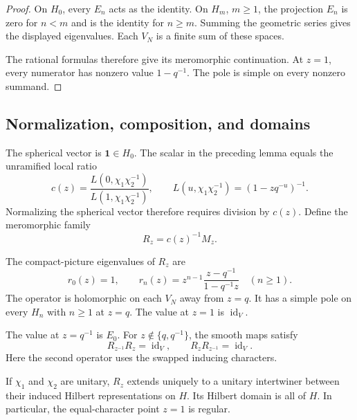 \begin{proof}
On $H_0$, every $E_n$ acts as the identity.
On $H_m$, $m\ge1$, the projection $E_n$ is zero for $n<m$ and
is the identity for $n\ge m$.
Summing the geometric series gives the displayed eigenvalues.
Each $V_N$ is a finite sum of these spaces.

The rational formulas therefore give its meromorphic continuation.
At $z=1$, every numerator has nonzero value $1-q^{-1}$.
The pole is simple on every nonzero summand.
\end{proof}

\subsection{Normalization, composition, and domains}

The spherical vector is $\mathbf1\in H_0$.
The scalar in the preceding lemma equals the unramified local ratio
\[
 c(z)=\frac{L(0,\chi_1\chi_2^{-1})}
 {L(1,\chi_1\chi_2^{-1})},\qquad
 L(u,\chi_1\chi_2^{-1})=(1-zq^{-u})^{-1}.
\]
Normalizing the spherical vector therefore requires division by $c(z)$.
Define the meromorphic family
\begin{equation}
\label{v4-arith:ic:eis:normalized-intertwiner}
 R_z=c(z)^{-1}M_z.
\end{equation}

\begin{theorem}
\label{v4-arith:ic:eis:normalized-theorem}
\label{v4-arith:ic:w6-d:prop:local-FE}
The compact-picture eigenvalues of $R_z$ are
\begin{equation}
\label{v4-arith:ic:eis:normalized-eigenvalues}
 r_0(z)=1,\qquad
 r_n(z)=z^{n-1}\frac{z-q^{-1}}{1-q^{-1}z}\quad(n\ge1).
\end{equation}
The operator is holomorphic on each $V_N$ away from $z=q$.
It has a simple pole on every $H_n$ with $n\ge1$ at $z=q$.
The value at $z=1$ is $\operatorname{id}_V$.

The value at $z=q^{-1}$ is $E_0$.
For $z\notin\{q,q^{-1}\}$, the smooth maps satisfy
\[
 R_{z^{-1}}R_z=\operatorname{id}_V,
 \qquad R_zR_{z^{-1}}=\operatorname{id}_V.
\]
Here the second operator uses the swapped inducing characters.

If $\chi_1$ and $\chi_2$ are unitary, $R_z$ extends uniquely to a
unitary intertwiner between their induced Hilbert representations on $H$.
Its Hilbert domain is all of $H$.
In particular, the equal-character point $z=1$ is regular.
\end{theorem}

